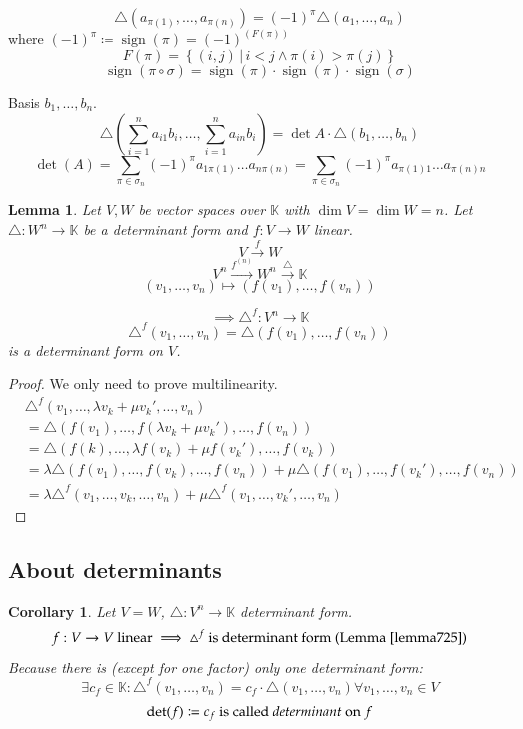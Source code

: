 \documentclass[a4paper]{article}
\newcounter{lecref}[section]
\numberwithin{lecref}{section}
\newtheorem{lemma}[lecref]{Lemma}
\newtheorem{corollary}[lecref]{Corollary}
\newcommand{\setdef}[2]{\left\{\left.#1\,\right|\,#2\right\}}
\DeclareMathOperator{\sign}{sign}
\begin{document}
\[ \triangle (a_{\pi(1)}, \dots, a_{\pi(n)}) = (-1)^\pi \triangle(a_1,\dots,a_n) \]
where $(-1)^\pi \coloneqq \sign(\pi) = (-1)^{(F(\pi))}$
\[ F(\pi) = \setdef{(i,j)}{i < j \land \pi(i) > \pi(j)} \]
\[ \sign(\pi \circ \sigma) = \sign(\pi) \cdot \sign(\pi) \cdot \sign(\sigma) \]

Basis $b_1,\dots,b_n$.
\[ \triangle(\sum_{i=1}^n a_{i1} b_i, \dots, \sum_{i=1}^n a_{in} b_i) = \det{A} \cdot \triangle(b_1, \dots, b_n) \]
\[ \det(A) = \sum_{\pi \in \sigma_n} (-1)^\pi  a_{1\pi(1)} \dots a_{n\pi(n)} = \sum_{\pi \in \sigma_n} (-1)^\pi a_{\pi(1) 1} \dots a_{\pi(n) n} \]

\begin{lemma} %
  \label{lemma725}
  Let $V, W$ be vector spaces over $\mathbb K$ with $\dim{V} = \dim{W} = n$.
  Let $\triangle: W^n \to \mathbb K$ be a determinant form and $f: V \to W$ linear.
  \[ V \xrightarrow{f} W \]
  \[ V^n \xrightarrow{f^{(n)}} W^n \xrightarrow{\triangle} \mathbb K \]
  \[ (v_1, \dots, v_n) \mapsto (f(v_1), \dots, f(v_n)) \]

  \[ \implies \triangle^f: V^n \to \mathbb K \]
  \[ \triangle^f(v_1, \dots, v_n) = \triangle(f(v_1), \dots, f(v_n)) \]
  is a determinant form on $V$.
\end{lemma}

\begin{proof}
  We only need to prove multilinearity.
  \begin{align*}
    &\triangle^f (v_1, \dots, \lambda v_k + \mu v_k', \dots, v_n) \\
    &= \triangle (f(v_1), \dots, f(\lambda v_k + \mu v_k'), \dots, f(v_n)) \\
    &= \triangle(f(k), \dots, \lambda f(v_k) + \mu f(v_k'), \dots, f(v_k)) \\
    &= \lambda \triangle (f(v_1), \dots, f(v_k), \dots, f(v_n)) + \mu \triangle(f(v_1), \dots, f(v_k'), \dots, f(v_n)) \\
    &= \lambda \triangle^f(v_1, \dots, v_k, \dots, v_n) + \mu \triangle^f (v_1, \dots, v_k', \dots, v_n)
  \end{align*}
\end{proof}

\subsection{About determinants}

\begin{corollary} %
  \label{cor726}
  Let $V = W$, $\triangle: V^n \to \mathbb K$ determinant form.
  \[ f: V \to V \text{ linear} \implies \triangle^f \text{ is determinant form (Lemma~\ref{lemma725})} \]
  Because there is (except for one factor) only one determinant form:
  \[ \exists c_f \in \mathbb K: \triangle^f(v_1, \dots, v_n) = c_f \cdot \triangle(v_1, \dots, v_n) \forall v_1,\dots,v_n \in V \]
  \[ \det(f) \coloneqq c_f \text{ is called \emph{determinant} on } f \]
\end{corollary}
\end{document}
